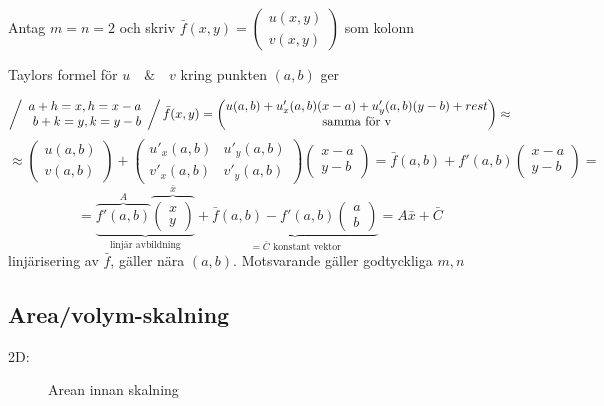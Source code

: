 \documentclass[a4paper]{article}
\begin{document}
Antag \(m=n=2\) och skriv \(\bar{f}(x,y) = 
\begin{pmatrix}
	u(x,y) \\
	v(x,y)
\end{pmatrix}\)
som kolonn \newline

Taylors formel för \(u \quad\&\quad v\) kring punkten \((a,b)\) ger

\[
\left/\begin{array}{rcl}
	a+h = x, h = x-a \\
	b+k = y, k = y-b
\end{array}\right/
\bar{f}(x,y) = 
\begin{pmatrix}
	u(a,b) + u'_x(a,b)(x-a) + u'_y(a,b)(y-b) + rest \\
	\text{samma för v}
\end{pmatrix} \approx
\]
\[
\approx 
\begin{pmatrix}
	u(a,b) \\
	v(a,b)
\end{pmatrix}
+
\begin{pmatrix}
	u'_x(a,b) & u'_y(a,b) \\
	v'_x(a,b) & v'_y(a,b)
\end{pmatrix}
\begin{pmatrix}
	x-a \\
	y-b
\end{pmatrix}
= \bar{f}(a,b) + f'(a,b)
\begin{pmatrix}
	x-a \\
	y-b
\end{pmatrix} =
\]
\[
	= \underbrace{\overbrace{f'(a,b)}^{A}\overbrace{
	\begin{pmatrix}
		x \\
		y
	\end{pmatrix}}^{\bar{x}}}_{\text{linjär avbildning}}
	+ \underbrace{\bar{f}(a,b) - f'(a,b)
	\begin{pmatrix}
		a \\
		b
	\end{pmatrix}}_{=\bar{C}\text{ konstant vektor}}
	= A\bar{x} + \bar{C}
\]
linjärisering av \(\bar{f}\), gäller nära \((a,b)\). Motsvarande gäller godtyckliga \(m,n\)

\subsection{Area/volym-skalning}
2D:

\begin{figure}[ht]
\usetikzlibrary{patterns}
  \caption{Arean innan skalning} \label{fig:7.1}
\end{figure}
\end{document}
